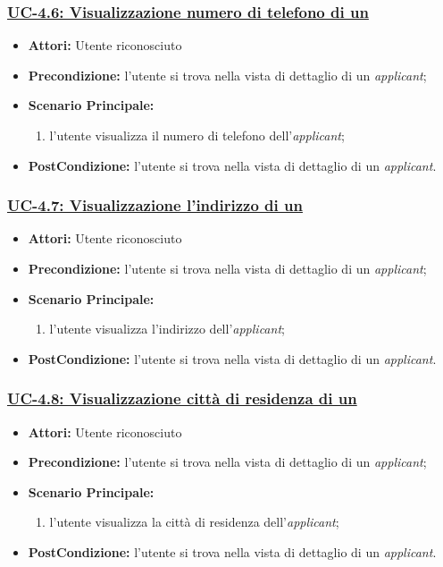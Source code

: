 \subsubsection{\underline{UC-4.6: Visualizzazione numero di telefono di un \applicant}}
\begin{itemize}
	\item \textbf{Attori:} Utente riconosciuto
	\item \textbf{Precondizione:} l'utente si trova nella vista di dettaglio di un \textit{applicant};
	\item \textbf{Scenario Principale:}
	\begin{enumerate} 
		\item l'utente visualizza il numero di telefono dell'\textit{applicant};
	\end{enumerate}
	\item \textbf{PostCondizione:} l'utente si trova nella vista di dettaglio di un \textit{applicant}.
\end{itemize}

\subsubsection{\underline{UC-4.7: Visualizzazione l'indirizzo di un \applicant}}
\begin{itemize}
	\item \textbf{Attori:} Utente riconosciuto
	\item \textbf{Precondizione:} l'utente si trova nella vista di dettaglio di un \textit{applicant};
	\item \textbf{Scenario Principale:}
	\begin{enumerate} 
		\item l'utente visualizza l'indirizzo dell'\textit{applicant};
	\end{enumerate}
	\item \textbf{PostCondizione:} l'utente si trova nella vista di dettaglio di un \textit{applicant}.
\end{itemize}

\subsubsection{\underline{UC-4.8: Visualizzazione città di residenza di un \applicant}}
\begin{itemize}
	\item \textbf{Attori:} Utente riconosciuto
	\item \textbf{Precondizione:} l'utente si trova nella vista di dettaglio di un \textit{applicant};
	\item \textbf{Scenario Principale:}
	\begin{enumerate} 
		\item l'utente visualizza la città di residenza dell'\textit{applicant};
	\end{enumerate}
	\item \textbf{PostCondizione:} l'utente si trova nella vista di dettaglio di un \textit{applicant}.
\end{itemize}

